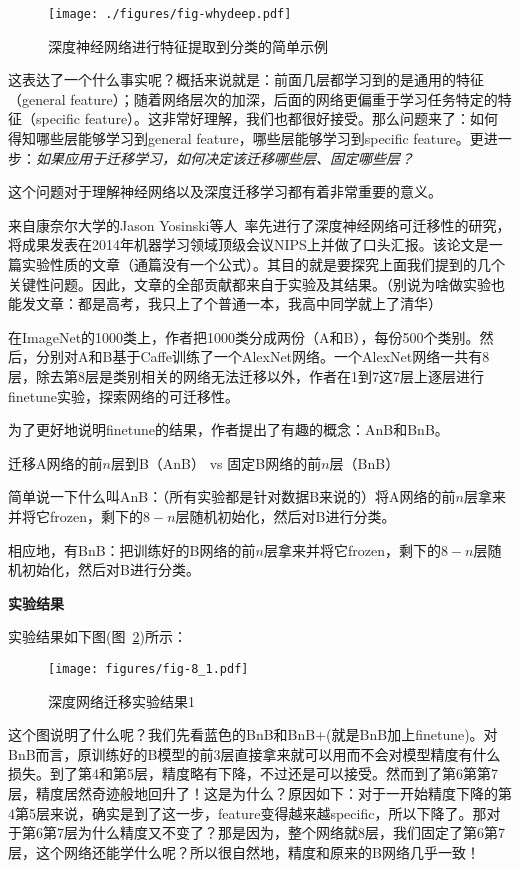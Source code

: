 \begin{figure}[htbp]
	\centering
	\texttt{[image: ./figures/fig-whydeep.pdf]}
	\caption{深度神经网络进行特征提取到分类的简单示例}
	\label{fig-whydeep}
\end{figure}

这表达了一个什么事实呢？概括来说就是：前面几层都学习到的是通用的特征（general feature）；随着网络层次的加深，后面的网络更偏重于学习任务特定的特征（specific feature）。这非常好理解，我们也都很好接受。那么问题来了：如何得知哪些层能够学习到general feature，哪些层能够学习到specific feature。更进一步：\textit{如果应用于迁移学习，如何决定该迁移哪些层、固定哪些层？}

这个问题对于理解神经网络以及深度迁移学习都有着非常重要的意义。

来自康奈尔大学的Jason Yosinski等人~\cite{yosinski2014transferable}率先进行了深度神经网络可迁移性的研究，将成果发表在2014年机器学习领域顶级会议NIPS上并做了口头汇报。该论文是一篇实验性质的文章（通篇没有一个公式）。其目的就是要探究上面我们提到的几个关键性问题。因此，文章的全部贡献都来自于实验及其结果。（别说为啥做实验也能发文章：都是高考，我只上了个普通一本，我高中同学就上了清华）

在ImageNet的1000类上，作者把1000类分成两份（A和B），每份500个类别。然后，分别对A和B基于Caffe训练了一个AlexNet网络。一个AlexNet网络一共有8层，除去第8层是类别相关的网络无法迁移以外，作者在1到7这7层上逐层进行finetune实验，探索网络的可迁移性。

为了更好地说明finetune的结果，作者提出了有趣的概念：AnB和BnB。

迁移A网络的前$n$层到B（AnB） vs 固定B网络的前$n$层（BnB）

简单说一下什么叫AnB：（所有实验都是针对数据B来说的）将A网络的前$n$层拿来并将它frozen，剩下的$8-n$层随机初始化，然后对B进行分类。

相应地，有BnB：把训练好的B网络的前$n$层拿来并将它frozen，剩下的$8-n$层随机初始化，然后对B进行分类。

\textbf{实验结果}

实验结果如下图(图~\ref{fig-8-2})所示：

\begin{figure}[htbp]
	\centering
	\texttt{[image: figures/fig-8\_1.pdf]}
	\caption{深度网络迁移实验结果1}
	\label{fig-8-2}
\end{figure}

这个图说明了什么呢？我们先看蓝色的BnB和BnB+(就是BnB加上finetune)。对BnB而言，原训练好的B模型的前3层直接拿来就可以用而不会对模型精度有什么损失。到了第4和第5层，精度略有下降，不过还是可以接受。然而到了第6第第7层，精度居然奇迹般地回升了！这是为什么？原因如下：对于一开始精度下降的第4第5层来说，确实是到了这一步，feature变得越来越specific，所以下降了。那对于第6第7层为什么精度又不变了？那是因为，整个网络就8层，我们固定了第6第7层，这个网络还能学什么呢？所以很自然地，精度和原来的B网络几乎一致！

